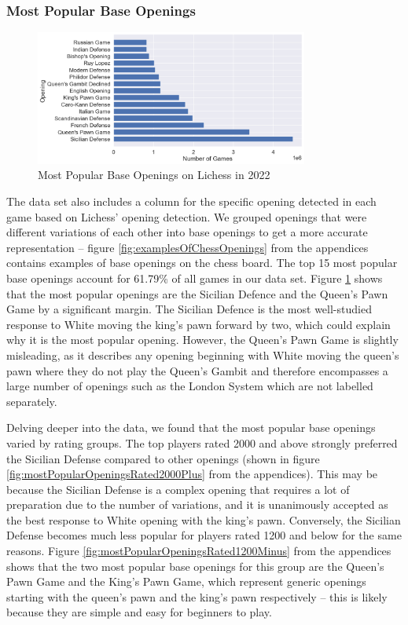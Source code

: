 \documentclass[a4paper, 11pt]{article}
\begin{document}
\subsubsection{Most Popular Base Openings}

\begin{figure}[H]
    \centering
    \caption{Most Popular Base Openings on Lichess in 2022}
    \label{fig:mostPopularOpenings}
    \includegraphics[width=0.8\textwidth]{Most Popular Base Openings.png}
\end{figure}

The data set also includes a column for the specific opening detected in each game based on Lichess' opening detection. We grouped openings that were different variations of each other into base openings to get a more accurate representation -- figure \ref{fig:examplesOfChessOpenings} from the appendices contains examples of base openings on the chess board. The top 15 most popular base openings account for 61.79\% of all games in our data set. Figure \ref{fig:mostPopularOpenings} shows that the most popular openings are the Sicilian Defence and the Queen's Pawn Game by a significant margin. The Sicilian Defence is the most well-studied response to White moving the king's pawn forward by two, which could explain why it is the most popular opening. However, the Queen's Pawn Game is slightly misleading, as it describes any opening beginning with White moving the queen's pawn where they do not play the Queen's Gambit and therefore encompasses a large number of openings such as the London System which are not labelled separately.

Delving deeper into the data, we found that the most popular base openings varied by rating groups. The top players rated 2000 and above strongly preferred the Sicilian Defense compared to other openings (shown in figure \ref{fig:mostPopularOpeningsRated2000Plus} from the appendices). This may be because the Sicilian Defense is a complex opening that requires a lot of preparation due to the number of variations, and it is unanimously accepted as the best response to White opening with the king's pawn. Conversely, the Sicilian Defense becomes much less popular for players rated 1200 and below for the same reasons. Figure \ref{fig:mostPopularOpeningsRated1200Minus} from the appendices shows that the two most popular base openings for this group are the Queen's Pawn Game and the King's Pawn Game, which represent generic openings starting with the queen's pawn and the king's pawn respectively -- this is likely because they are simple and easy for beginners to play.
\end{document}
